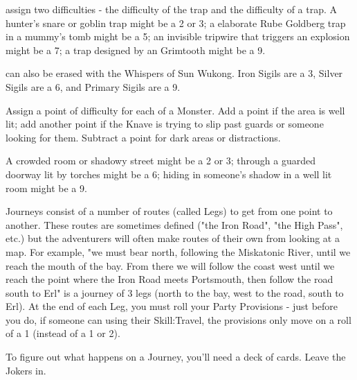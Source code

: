 {\begin{multicols}{2}
        assign two difficulties - the difficulty of  the trap and the difficulty of  a trap.  A hunter's snare or goblin trap might be a 2 or 3; a elaborate Rube Goldberg trap in a mummy's tomb might be a 5; an invisible tripwire that triggers an explosion might be a 7; a trap designed by an Grimtooth might be a 9.

       can also be erased with the Whispers of Sun Wukong. Iron Sigils are a 3, Silver Sigils are a 6, and Primary Sigils are a 9.


  
     Assign a point of difficulty for each \HD of a Monster.  Add a point if the area is well lit; add another point if the Knave is trying to slip past guards or someone looking for them.  Subtract a point for dark areas or distractions.

    A crowded room or shadowy street might be a 2 or 3; through a guarded doorway lit by torches might be a 6; hiding in someone's shadow in a well lit room might be a 9.





Journeys consist of a number of routes (called Legs) to get from one point to another.  These routes are sometimes defined ("the Iron Road", "the High Pass", etc.) but the adventurers will often make routes of their own from looking at a map.  For example, "we must bear north, following the Miskatonic River, until we reach the mouth of the bay.  From there we will follow the coast west until we reach the point where the Iron Road meets Portsmouth, then follow the road south to Erl" is a journey of 3 legs (north to the bay, west to the road, south to Erl).  At the end of each Leg, you must roll your Party Provisions \UD - just before you do, if someone can \RO using their Skill:Travel, the provisions only move \DCDOWN on a roll of a 1 (instead of a 1 or 2).

To figure out what happens on a Journey, you'll need a deck of cards.  Leave the Jokers in.


\end{multicols}}
